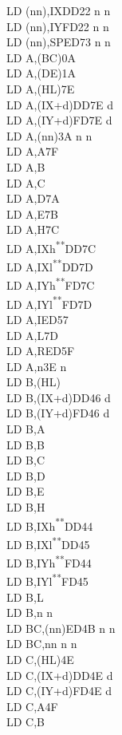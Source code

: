 \documentclass[twoside,openright,a4paper]{book}
\newcommand{\UNDOC}{\textnormal{\textsuperscript{**}}}
\begin{document}
\begin{multicols}{3}
{\begin{tabbing}
	LD (nn),IX\>DD22 n n\\
	LD (nn),IY\>FD22 n n\\
	LD (nn),SP\>ED73 n n\\
	LD A,(BC)\>0A\\
	LD A,(DE)\>1A\\
	LD A,(HL)\>7E\\
	LD A,(IX+d)\>DD7E d\\
	LD A,(IY+d)\>FD7E d\\
	LD A,(nn)\>3A n n\\
	LD A,A\>7F\\
	LD A,B\\
	LD A,C\\
	LD A,D\>7A\\
	LD A,E\>7B\\
	LD A,H\>7C\\
	LD A,IXh\UNDOC\>DD7C\\
	LD A,IXl\UNDOC\>DD7D\\
	LD A,IYh\UNDOC\>FD7C\\
	LD A,IYl\UNDOC\>FD7D\\
	LD A,I\>ED57\\
	LD A,L\>7D\\
	LD A,R\>ED5F\\
	LD A,n\>3E n\\
	LD B,(HL)\\
	LD B,(IX+d)\>DD46 d\\
	LD B,(IY+d)\>FD46 d\\
	LD B,A\\
	LD B,B\\
	LD B,C\\
	LD B,D\\
	LD B,E\\
	LD B,H\\
	LD B,IXh\UNDOC\>DD44\\
	LD B,IXl\UNDOC\>DD45\\
	LD B,IYh\UNDOC\>FD44\\
	LD B,IYl\UNDOC\>FD45\\
	LD B,L\\
	LD B,n n\\
	LD BC,(nn)\>ED4B n n\\
	LD BC,nn n n\\
	LD C,(HL)\>4E\\
	LD C,(IX+d)\>DD4E d\\
	LD C,(IY+d)\>FD4E d\\
	LD C,A\>4F\\
	LD C,B\\

\end{tabbing}}
\end{multicols}
\end{document}
